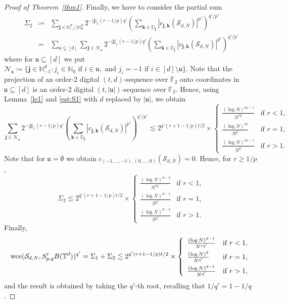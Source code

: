 \documentclass[12pt, a4paper]{article}
\def\S{\mathcal{S}}
\newcommand{\wce}{{\rm wce}}
\newcommand{\uu}{\mathfrak{u}}
\newcommand{\bsj}{{\boldsymbol{j}}}
\newcommand{\bsk}{{\boldsymbol{k}}}
\newcommand{\bbT}{{\mathbb{T}}}
\newcommand{\bbN}{{\mathbb{N}}}
\newcommand{\bbD}{{\mathbb{D}}}
\newcommand{\bbF}{{\mathbb{F}}}
\begin{document}
\begin{proof}[Proof of Theorem~\ref{thm1}]
Finally, we have to consider the partial sum
\begin{eqnarray*}
\Sigma_2 & \coloneqq & \sum_{\bsj \in \bbN_{-1}^d \setminus \bbN_0^d}2^{-|\bsj|_1 (r-1/p) q'} \left(\sum_{\bsk \in \bbD_{\bsj}} |c_{\bsj, \bsk}(\S_{d,N})|^{p'}\right)^{q'/p'}\\
& = & \sum_{\uu \subsetneq [d]} \sum_{\bsj \in \mathcal{N}_{\uu}} 2^{-|\bsj|_1 (r-1/p) q'} \left(\sum_{\bsk \in \bbD_{\bsj}} |c_{\bsj, \bsk}(\S_{d,N})|^{p'}\right)^{q'/p'} 
\end{eqnarray*}
where for $\uu \subseteq [d]$ we put $\mathcal{N}_{\uu}\coloneqq\{\bsj \in \bbN_{-1}^d : j_i \in \bbN_0 \mbox{ if } i \in \uu, \mbox{ and } j_i=-1 \mbox{ if } i \in [d]\setminus\uu\}$. Note that the projection of an order-2 digital $(t,d)$-sequence over $\bbF_2$ onto coordinates in $\uu \subseteq [d]$ is an order-2 digital $(t,|\uu|)$-sequence over $\bbF_2$. Hence, using Lemma~\ref{le1} and \eqref{est:S1} with $d$ replaced by $|\uu|$, we obtain
\begin{equation*}
\sum_{\bsj \in \mathcal{N}_{\uu}} 2^{-|\bsj|_1 (r-1/p) q'} \left(\sum_{\bsk \in \bbD_{\bsj}} |c_{\bsj, \bsk}(\S_{d,N})|^{p'}\right)^{q'/p'}
\lesssim 2^{q'(r+1-1/p)t/2} \times \left\{ 
\begin{array}{ll}
\frac{(\log N)^{|\uu|-1}}{N^{rq'}} & \mbox{if } r < 1,\\[0.5em]
\frac{(\log N)^{|\uu|}}{N^{q'}} & \mbox{if } r = 1,\\[0.5em]
\frac{(\log N)^{|\uu|-1}}{N^{q'}} & \mbox{if } r>1.
\end{array}\right. 
\end{equation*}
Note that for $\uu=\emptyset$ we obtain $c_{(-1,\ldots,-1),(0,\ldots,0)}(\S_{d,N})=0$. Hence, for $r \ge 1/p$, 
\begin{equation*}
\Sigma_2 \lesssim 2^{q'(r+1-1/p)t/2} \times \left\{ 
\begin{array}{ll}
\frac{(\log N)^{d-2}}{N^{rq'}} & \mbox{if } r < 1,\\[0.5em]
\frac{(\log N)^{d-1}}{N^{q'}} & \mbox{if } r = 1,\\[0.5em]
\frac{(\log N)^{d-2}}{N^{q'}} & \mbox{if } r>1.
\end{array}\right. 
\end{equation*}
Finally,
\begin{equation*}
\wce(\S_{d,N}, S^r_{p, q}B(\bbT^d))^{q'} = \Sigma_1 + \Sigma_2 \lesssim 2^{q'(r+1-1/p)t/2} \times \left\{ 
\begin{array}{ll}
\frac{(\log N)^{d-1}}{N^{rq'}} & \mbox{if } r < 1,\\[0.5em]
\frac{(\log N)^{d}}{N^{q'}} & \mbox{if } r = 1,\\[0.5em]
\frac{(\log N)^{d-1}}{N^{q'}} & \mbox{if } r>1,
\end{array}\right.
\end{equation*}
and the result is obtained by taking the $q'$-th root, recalling that $1/q' = 1 - 1/q$.
\end{proof}
\end{document}
